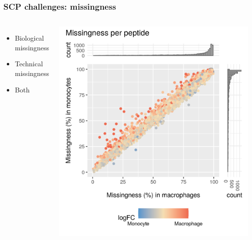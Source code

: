 \documentclass{beamer}
\begin{document}
\begin{frame}
  \frametitle{SCP challenges: missingness}
  
  \begin{columns}
    \begin{itemize}
      \item Biological missingness
      \item Technical missingness
      \item Both
    \end{itemize}
    \includegraphics[width=\linewidth]{figs/missing_peptide.png}
  \end{columns}
  
\end{frame}
\end{document}
